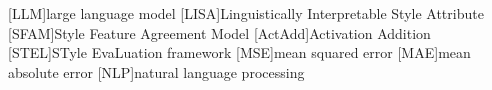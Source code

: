 
\begin{acronym}[ActAdd] %
  [LLM]{large language model}
  [LISA]{Linguistically Interpretable Style Attribute}
  [SFAM]{Style Feature Agreement Model}
  [ActAdd]{Activation Addition}
  [STEL]{STyle EvaLuation framework}
  [MSE]{mean squared error}
  [MAE]{mean absolute error}
  [NLP]{natural language processing}
\end{acronym}